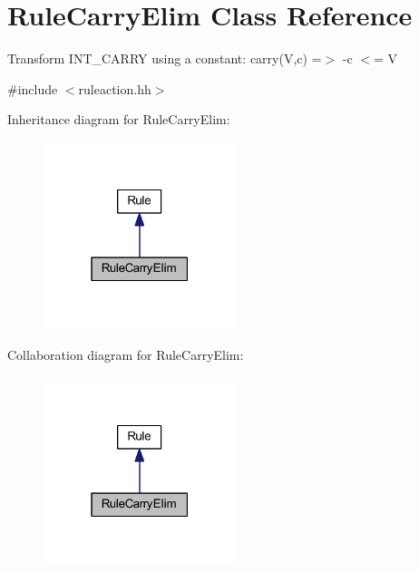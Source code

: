 \hypertarget{class_rule_carry_elim}{}\section{Rule\+Carry\+Elim Class Reference}
\label{class_rule_carry_elim}


Transform I\+N\+T\+\_\+\+C\+A\+R\+RY using a constant\+: {\ttfamily carry(\+V,c) =$>$ -\/c $<$= V}  




{\ttfamily \#include $<$ruleaction.\+hh$>$}



Inheritance diagram for Rule\+Carry\+Elim\+:
\nopagebreak
\begin{figure}[H]
\begin{center}
\leavevmode
\includegraphics[width=159pt]{class_rule_carry_elim__inherit__graph}
\end{center}
\end{figure}


Collaboration diagram for Rule\+Carry\+Elim\+:
\nopagebreak
\begin{figure}[H]
\begin{center}
\leavevmode
\includegraphics[width=159pt]{class_rule_carry_elim__coll__graph}
\end{center}
\end{figure}
